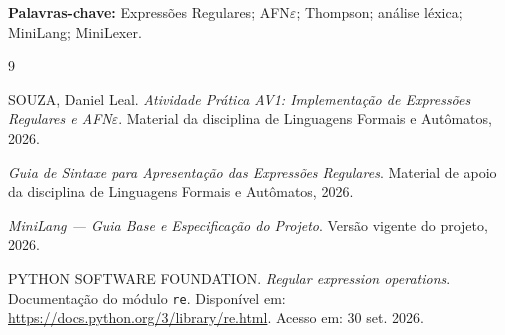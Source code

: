 \documentclass[12pt,a4paper,oneside]{report}
\begin{document}
\textbf{Palavras-chave:} Expressões Regulares; AFN$\varepsilon$; Thompson; análise léxica; MiniLang; MiniLexer.

\tableofcontents
\clearpage
{}













\renewcommand{\bibname}{Referências}
\begin{thebibliography}{9}
SOUZA, Daniel Leal. \textit{Atividade Prática AV1: Implementação de Expressões Regulares e AFN$\varepsilon$}. Material da disciplina de Linguagens Formais e Autômatos, 2026.

\textit{Guia de Sintaxe para Apresentação das Expressões Regulares}. Material de apoio da disciplina de Linguagens Formais e Autômatos, 2026.

\textit{MiniLang --- Guia Base e Especificação do Projeto}. Versão vigente do projeto, 2026.

PYTHON SOFTWARE FOUNDATION. \textit{Regular expression operations}. Documentação do módulo \texttt{re}. Disponível em: \url{https://docs.python.org/3/library/re.html}. Acesso em: 30 set. 2026.
\end{thebibliography}
\end{document}
